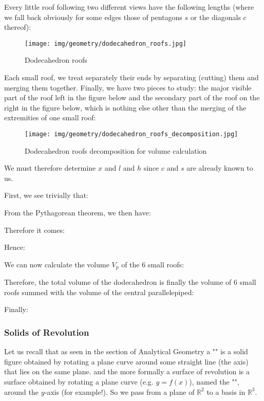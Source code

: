 {	Every little roof following two different views have the following lengths (where we fall back obviously for some edges those of pentagons $s$ or the diagonals $c$ thereof): 
	\begin{figure}[H]
		\centering
		\texttt{[image: img/geometry/dodecahedron\_roofs.jpg]}
		\caption[]{Dodecahedron roofs}
	\end{figure}
	Each small roof, we treat separately their ends by separating (cutting) them and merging them together. Finally, we have two pieces to study: the major visible part of the roof left in the figure below and the secondary part of the roof on the right in the figure below, which is nothing else other than the merging of the extremities of one small roof:
	\begin{figure}[H]
		\centering
		\texttt{[image: img/geometry/dodecahedron\_roofs\_decomposition.jpg]}
		\caption[]{Dodecahedron roofs decomposition for volume calculation}
	\end{figure}
	We must therefore determine $x$ and $l$ and $h$ since $c$ and $s$ are already known to us.

	First, we see trivially that:
	
	From the Pythagorean theorem, we then have:
	
	Therefore it comes:
	
	Hence:
	
	We can now calculate the volume $V_p$ of the $6$ small roofs:
	
	Therefore, the total volume of the dodecahedron is finally the volume of $6$ small roofs summed with the volume of the central parallelepiped:
	
	Finally:
	
	
	\subsubsection{Solids of Revolution}
	Let us recall that as seen in the section of Analytical Geometry a "\label{solid of revolution}" is a solid figure obtained by rotating a plane curve around some straight line (the axis) that lies on the same plane. and the more formally a surface of revolution is a surface obtained by rotating a plane curve (e.g. $y=f(x)$), named the "", around the $y$-axis (for example!). So we pass from a plane of $\mathbb{R}^2$ to a basis in $\mathbb{R}^3$.
	
}
